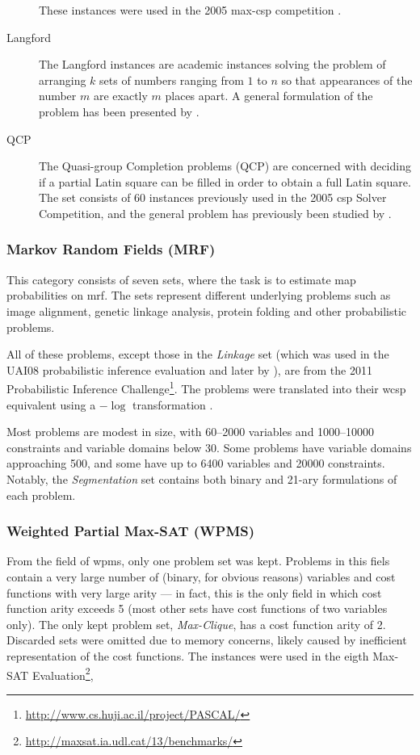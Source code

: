 \begin{description}
		These instances were used in the 2005 max-\gls{csp} competition \parencite{Boussemart05}.
	\item[Langford]
		The Langford instances are academic instances solving the problem of arranging \(k\) sets of numbers ranging from \(1\) to \(n\) so that appearances of the number \(m\) are exactly \(m\) places apart.
		A general formulation of the problem has been presented by \textcite{Linek03}.
	\item[QCP]
		The Quasi-group Completion problems (QCP) are concerned with deciding if a partial Latin square can be filled in order to obtain a full Latin square.
		The set consists of 60 instances previously used in the 2005 \gls{csp} Solver Competition, and the general problem has previously been studied by \textcite{Gomes02}.
\end{description}

\subsubsection{Markov Random Fields (MRF)}
This category consists of seven sets, where the task is to estimate \gls{map} probabilities on \gls{mrf}. The sets represent different underlying problems such as image alignment, genetic linkage analysis, protein folding and other probabilistic problems.

All of these problems, except those in the \emph{Linkage} set (which was used in the UAI08 probabilistic inference evaluation and later by \textcites{Favier11}{Kishimoto13}), are from the 2011 Probabilistic Inference Challenge\footnote{\url{http://www.cs.huji.ac.il/project/PASCAL/}}.
The problems were translated into their \gls{wcsp} equivalent using a \(-\log{}\) transformation \parencite[\pno~4]{deGivry14}.

Most problems are modest in size, with \numrange{60}{2000} variables and \numrange{1000}{10000} constraints and variable domains below \num{30}. 
Some problems have variable domains approaching \num{500}, and some have up to \num{6400} variables and \num{20000} constraints.
Notably, the \emph{Segmentation} set contains both binary and 21-ary formulations of each problem.


\subsubsection{Weighted Partial Max-SAT (WPMS)}
From the field of \gls{wpms}, only one problem set was kept.
Problems in this fiels contain a very large number of (binary, for obvious reasons) variables and cost functions with very large arity --- in fact, this is the only field in which cost function arity exceeds \num{5} (most other sets have cost functions of two variables only).
The only kept problem set, \emph{Max-Clique}, has a cost function arity of \num{2}.
Discarded sets were omitted due to memory concerns, likely caused by inefficient representation of the cost functions.
The instances were used in the eigth Max-SAT Evaluation\footnote{\url{http://maxsat.ia.udl.cat/13/benchmarks/}},

